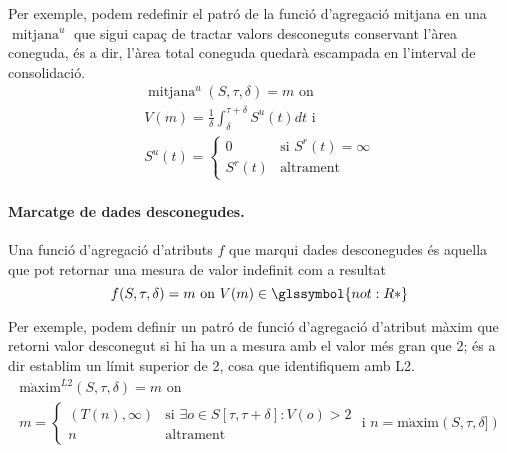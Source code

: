 Per exemple, podem redefinir el patró de la funció d'agregació mitjana
en una $\operatorname{mitjana}^{u}$ que sigui capaç de tractar valors
desconeguts conservant l'àrea coneguda, és a dir, l'àrea total
coneguda quedarà escampada en l'interval de consolidació.
\begin{gather*}
  \operatorname{mitjana}^{u}(S,\tau,\delta)=m \text{ on }\\
  V(m) = \frac{1}{\delta}\int_{\delta}^{\tau+\delta} S^u(t)dt \text{ i }\\
  S^u(t)=
  \begin{cases}
    0 &\text{si }  S^r(t)=\infty\\
    S^r(t) & \text{altrament }
  \end{cases}
\end{gather*}


\paragraph{Marcatge de dades desconegudes.}
Una funció d'agregació d'atributs $f$ que marqui
dades desconegudes és aquella que pot retornar una mesura de valor
indefinit com a resultat
\[
f(S,\tau,\delta)=m \text{ on } V(m)\in \glssymbol{not:R*}
\]


Per exemple, podem definir un patró de funció d'agregació d'atribut
màxim que retorni valor desconegut
si hi ha un a mesura amb el valor més gran que 2; és a dir establim un
límit superior de 2, cosa que identifiquem amb L2. 
\begin{gather*}
  \operatorname{m\grave{a}xim}^{L2}(S,\tau,\delta)=m \text{ on }\\
  m = \begin{cases}
    (T(n),\infty) &\text{si }  \exists o\in S[\tau,\tau+\delta]: V(o)>2\\
    n & \text{altrament }
  \end{cases} \text{ i } n= \operatorname{m\grave{a}xim}(S,\tau,\delta])
\end{gather*}















